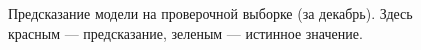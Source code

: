 \begin{figure}[h]
        \noindent{}
        \caption{Предсказание модели на проверочной выборке (за декабрь). Здесь красным --- предсказание, зеленым --- истинное значение.}
        \label{img:test}
\end{figure}